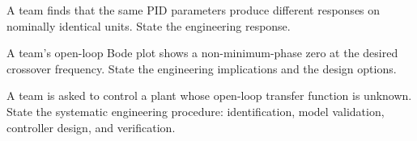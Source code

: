 \begin{exercise}
A team finds that the same PID parameters produce different responses on nominally identical units. State the engineering response.
\end{exercise}

\begin{exercise}
A team's open-loop Bode plot shows a non-minimum-phase zero at the desired crossover frequency. State the engineering implications and the design options.
\end{exercise}

\begin{exercise}
A team is asked to control a plant whose open-loop transfer function is unknown. State the systematic engineering procedure: identification, model validation, controller design, and verification.
\end{exercise}
